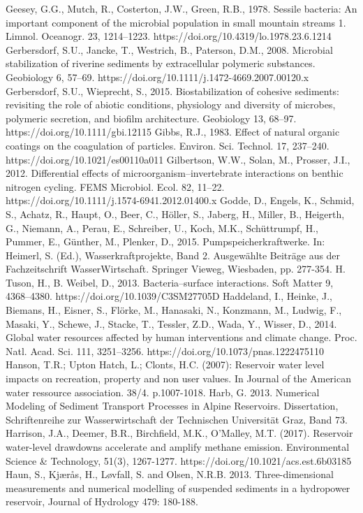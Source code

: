 \begin{thebibliography}{}
Geesey, G.G., Mutch, R., Costerton, J.W., Green, R.B., 1978. Sessile bacteria: An important component of the microbial population in small mountain streams 1. Limnol. Oceanogr. 23, 1214–1223. https://doi.org/10.4319/lo.1978.23.6.1214
Gerbersdorf, S.U., Jancke, T., Westrich, B., Paterson, D.M., 2008. Microbial stabilization of riverine sediments by extracellular polymeric substances. Geobiology 6, 57–69. https://doi.org/10.1111/j.1472-4669.2007.00120.x
Gerbersdorf, S.U., Wieprecht, S., 2015. Biostabilization of cohesive sediments: revisiting the role of abiotic conditions, physiology and diversity of microbes, polymeric secretion, and biofilm architecture. Geobiology 13, 68–97. https://doi.org/10.1111/gbi.12115
Gibbs, R.J., 1983. Effect of natural organic coatings on the coagulation of particles. Environ. Sci. Technol. 17, 237–240. https://doi.org/10.1021/es00110a011
Gilbertson, W.W., Solan, M., Prosser, J.I., 2012. Differential effects of microorganism–invertebrate interactions on benthic nitrogen cycling. FEMS Microbiol. Ecol. 82, 11–22. https://doi.org/10.1111/j.1574-6941.2012.01400.x
Godde, D., Engels, K., Schmid, S., Achatz, R., Haupt, O., Beer, C., Höller, S., Jaberg, H., Miller, B., Heigerth, G., Niemann, A., Perau, E., Schreiber, U., Koch, M.K., Schüttrumpf, H., Pummer, E., Günther, M., Plenker, D., 2015. Pumpspeicherkraftwerke. In: Heimerl, S. (Ed.), Wasserkraftprojekte, Band 2. Ausgewählte Beiträge aus der Fachzeitschrift WasserWirtschaft. Springer Vieweg, Wiesbaden, pp. 277-354.
H. Tuson, H., B. Weibel, D., 2013. Bacteria–surface interactions. Soft Matter 9, 4368–4380. https://doi.org/10.1039/C3SM27705D
Haddeland, I., Heinke, J., Biemans, H., Eisner, S., Flörke, M., Hanasaki, N., Konzmann, M., Ludwig, F., Masaki, Y., Schewe, J., Stacke, T., Tessler, Z.D., Wada, Y., Wisser, D., 2014. Global water resources affected by human interventions and climate change. Proc. Natl. Acad. Sci. 111, 3251–3256. https://doi.org/10.1073/pnas.1222475110
Hanson, T.R.; Upton Hatch, L.; Clonts, H.C. (2007): Reservoir water level impacts on recreation, property and non user values. In Journal of the American water ressource association. 38/4. p.1007-1018.
Harb, G. 2013. Numerical Modeling of Sediment Transport Processes in Alpine Reservoirs. Dissertation, Schriftenreihe zur Wasserwirtschaft der Technischen Universität Graz, Band 73.
Harrison, J.A., Deemer, B.R., Birchfield, M.K., O'Malley, M.T. (2017). Reservoir water-level drawdowns accelerate and amplify methane emission. Environmental Science & Technology, 51(3), 1267-1277. https://doi.org/10.1021/acs.est.6b03185
Haun, S., Kjærås, H., Løvfall, S. and Olsen, N.R.B. 2013. Three-dimensional measurements and numerical modelling of suspended sediments in a hydropower reservoir, Journal of Hydrology 479: 180-188.

\end{thebibliography}
